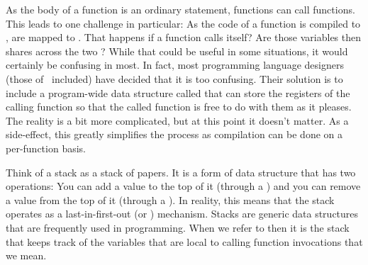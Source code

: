 As the body of a function is an ordinary statement, functions can call functions. This leads to one challenge in particular: As the code of a function is compiled to ,  are mapped to . That happens if a function calls itself? Are those variables then shares across the two ? While that could be useful in some situations, it would certainly be confusing in most. In fact, most programming language designers (those of \csharp\ included) have decided that it is too confusing. Their solution is to include a program-wide data structure called  that can store the registers of the calling function so that the called function is free to do with them as it pleases. The reality is a bit more complicated, but at this point it doesn't matter. As a side-effect, this greatly simplifies the  process as compilation can be done on a per-function basis.

Think of a stack as a stack of papers. It is a form of data structure that has two operations: You can add a value to the top of it (through a ) and you can remove a value from the top of it (through a ). In reality, this means that the stack operates as a last-in-first-out (or ) mechanism. Stacks are generic data structures that are frequently used in programming. When we refer to  then it is the stack that keeps track of the variables that are local to calling function invocations that we mean.

